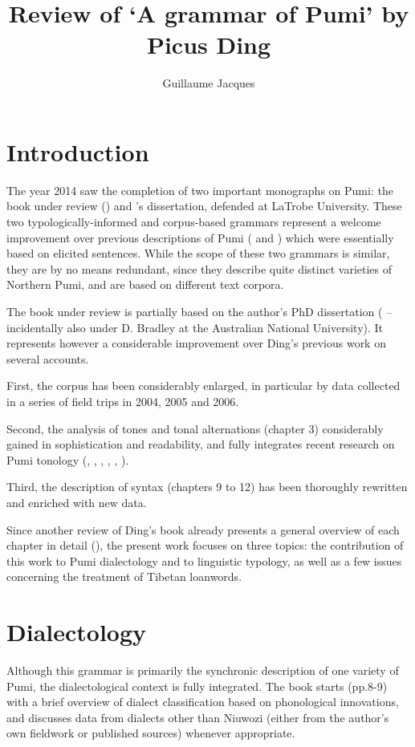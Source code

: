 \documentclass[oldfontcommands,oneside,a4paper,11pt]{article}
\begin{document}
\title{Review of `A grammar of Pumi' by Picus Ding}
\author{Guillaume Jacques}
\maketitle

\sloppy


\section{Introduction}
The year 2014 saw the completion of two important monographs on Pumi: the book under review (\citealt{ding14grammar}) and \citet{daudey14grammar}'s dissertation, defended at LaTrobe University. These two typologically-informed and corpus-based grammars represent a welcome improvement over previous descriptions of Pumi (\citealt{fual98pumi} and   \citealt{lusz01pumi}) which were essentially based on elicited sentences. While the scope of these two grammars is similar, they are by no means redundant, since they describe quite distinct varieties of Northern Pumi, and are based on different text corpora.

The book under review is partially based on the author's PhD dissertation (\citealt{ding98phd} -- incidentally also under D. Bradley at the Australian National University). It represents however a considerable improvement over Ding's previous work on several accounts. 

First, the corpus has been considerably enlarged, in particular by data collected in a series of field trips in 2004, 2005 and 2006.

Second, the analysis of tones and tonal alternations (chapter 3)  considerably gained in sophistication and readability, and fully integrates recent research on Pumi tonology  (\citealt{matisoff97pumi},  \citealt{ding01pitch},  \citealt{ding03sketch}, \citealt{ding06tonal}, \citealt{ding07perception}, \citealt{jacques11pumi.tone}).

Third, the description of syntax (chapters 9 to 12) has been thoroughly rewritten and enriched with new data.  

Since another review of Ding's book already presents a general overview of each chapter in detail (\citealt{daudey15review}), the present work focuses on three topics: the contribution of this work to Pumi dialectology and to linguistic typology, as well as a few issues concerning the treatment of Tibetan loanwords.


\section{Dialectology}
Although this grammar is primarily the synchronic description of one variety of Pumi,  the dialectological context is fully integrated. The book starts (pp.8-9) with a brief overview of dialect classification based on phonological innovations, and discusses data from dialects other than Niuwozi (either from the author's own fieldwork or published sources) whenever appropriate. 
\end{document}
